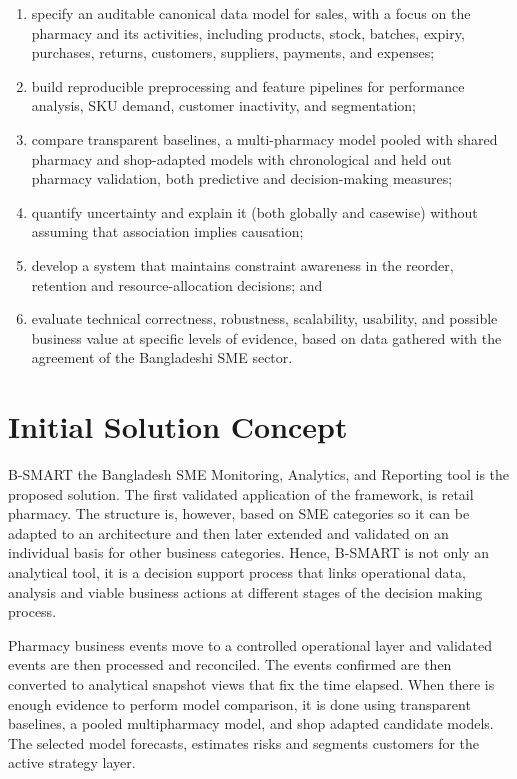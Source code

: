 \documentclass[a4paper,11pt,oneside]{book}
\theoremstyle{plain}
\theoremstyle{definition}
\theoremstyle{remark}
\begin{document}
\begin{enumerate}[label=O\arabic*.]

\item specify an auditable canonical data model for sales, with a focus on the pharmacy and its activities, including products, stock, batches, expiry, purchases, returns, customers, suppliers, payments, and expenses;

\item build reproducible preprocessing and feature pipelines for performance analysis, SKU demand, customer inactivity, and segmentation;

\item compare transparent baselines, a multi-pharmacy model pooled with shared pharmacy and shop-adapted models with chronological and held out pharmacy validation, both predictive and decision-making measures;

\item quantify uncertainty and explain it (both globally and casewise) without assuming that association implies causation;

\item develop a system that maintains constraint awareness in the reorder, retention and resource-allocation decisions; and

\item evaluate technical correctness, robustness, scalability, usability, and possible business value at specific levels of evidence, based on data gathered with the agreement of the Bangladeshi SME sector.


\end{enumerate}


\section{Initial Solution Concept}

B-SMART the Bangladesh SME Monitoring, Analytics, and Reporting tool is the proposed solution. The first validated application of the framework, is retail pharmacy. The structure is, however, based on SME categories so it can be adapted to an architecture and then later extended and validated on an individual basis for other business categories. Hence, B-SMART is not only an analytical tool, it is a decision support process that links operational data, analysis and viable business actions at different stages of the decision making process.

Pharmacy business events move to a controlled operational layer and validated events are then processed and reconciled. The events confirmed are then converted to analytical snapshot views that fix the time elapsed. When there is enough evidence to perform model comparison, it is done using transparent baselines, a pooled multipharmacy model, and shop adapted candidate models. The selected model forecasts, estimates risks and segments customers for the active strategy layer.
\end{document}
